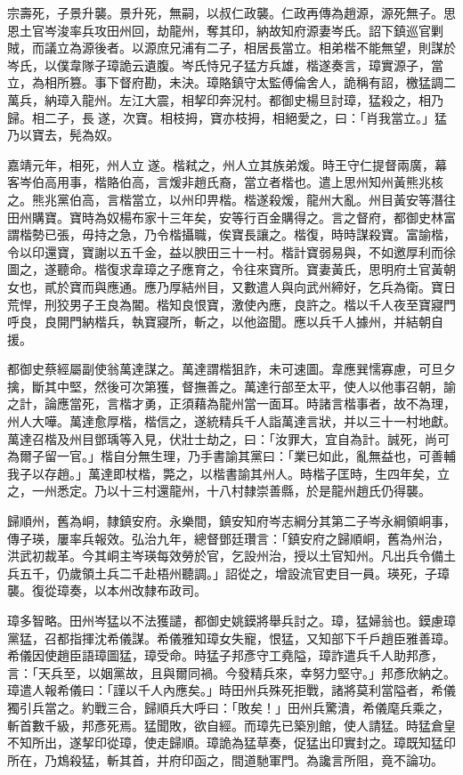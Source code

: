 \begin{pinyinscope}
宗壽死，子景升襲。景升死，無嗣，以叔仁政襲。仁政再傳為趙源，源死無子。思恩土官岑浚率兵攻田州回，劫龍州，奪其印，納故知府源妻岑氏。詔下鎮巡官剿賊，而議立為源後者。以源庶兄浦有二子，相居長當立。相弟楷不能無望，則謀於岑氏，以僕韋隊子璋詭云遺腹。岑氏恃兄子猛方兵雄，楷遂奏言，璋實源子，當立，為相所篡。事下督府勘，未決。璋賂鎮守太監傅倫舍人，詭稱有詔，檄猛調二萬兵，納璋入龍州。左江大震，相挈印奔況村。都御史楊旦討璋，猛殺之，相乃歸。相二子，長遂，次寶。相枝拇，寶亦枝拇，相絕愛之，曰：「肖我當立。」猛乃以寶去，髡為奴。

嘉靖元年，相死，州人立遂。楷弒之，州人立其族弟煖。時王守仁提督兩廣，幕客岑伯高用事，楷賂伯高，言煖非趙氏裔，當立者楷也。遣上思州知州黃熊兆核之。熊兆黨伯高，言楷當立，以州印畀楷。楷遂殺煖，龍州大亂。州目黃安等潛往田州購寶。寶時為奴楊布家十三年矣，安等行百金購得之。言之督府，都御史林富謂楷勢已張，毋持之急，乃令楷攝職，俟寶長讓之。楷復，時時謀殺寶。富諭楷，令以印還寶，寶謝以五千金，益以腴田三十一村。楷計寶弱易與，不如邀厚利而徐圖之，遂聽命。楷復求韋璋之子應育之，令往來寶所。寶妻黃氏，思明府土官黃朝女也，貳於寶而與應通。應乃厚結州目，又數遣人與向武州締好，乞兵為衛。寶日荒悍，刑狡男子王良為閽。楷知良恨寶，激使內應，良許之。楷以千人夜至寶寢門呼良，良開門納楷兵，執寶寢所，斬之，以他盜聞。應以兵千人據州，并結朝自援。

都御史蔡經屬副使翁萬達謀之。萬達謂楷狙詐，未可速圖。韋應巽懦寡慮，可旦夕擒，斷其中堅，然後可次第獲，督撫善之。萬達行部至太平，使人以他事召朝，諭之計，論應當死，言楷才勇，正須藉為龍州當一面耳。時諸言楷事者，故不為理，州人大嘩。萬達愈厚楷，楷信之，遂統精兵千人詣萬達言狀，并以三十一村地獻。萬達召楷及州目鄧瑀等入見，伏壯士劫之，曰：「汝罪大，宜自為計。誠死，尚可為爾子留一官。」楷自分無生理，乃手書諭其黨曰：「業已如此，亂無益也，可善輔我子以存趙。」萬達即杖楷，斃之，以楷書諭其州人。時楷子匡時，生四年矣，立之，一州悉定。乃以十三村還龍州，十八村隸崇善縣，於是龍州趙氏仍得襲。

歸順州，舊為峒，隸鎮安府。永樂間，鎮安知府岑志綱分其第二子岑永綱領峒事，傳子瑛，屢率兵報效。弘治九年，總督鄧廷瓚言：「鎮安府之歸順峒，舊為州治，洪武初裁革。今其峒主岑瑛每效勞於官，乞設州治，授以土官知州。凡出兵令備土兵五千，仍歲領土兵二千赴梧州聽調。」詔從之，增設流官吏目一員。瑛死，子璋襲。復從璋奏，以本州改隸布政司。

璋多智略。田州岑猛以不法獲譴，都御史姚鏌將舉兵討之。璋，猛婦翁也。鏌慮璋黨猛，召都指揮沈希儀謀。希儀雅知璋女失寵，恨猛，又知部下千戶趙臣雅善璋。希儀因使趙臣語璋圖猛，璋受命。時猛子邦彥守工堯隘，璋詐遣兵千人助邦彥，言：「天兵至，以姻黨故，且與爾同禍。今發精兵來，幸努力堅守。」邦彥欣納之。璋遣人報希儀曰：「謹以千人內應矣。」時田州兵殊死拒戰，諸將莫利當隘者，希儀獨引兵當之。約戰三合，歸順兵大呼曰：「敗矣！」田州兵驚潰，希儀麾兵乘之，斬首數千級，邦彥死焉。猛聞敗，欲自經。而璋先已築別館，使人請猛。時猛倉皇不知所出，遂挈印從璋，使走歸順。璋詭為猛草奏，促猛出印實封之。璋既知猛印所在，乃鴆殺猛，斬其首，并府印函之，間道馳軍門。為讒言所阻，竟不論功。


\end{pinyinscope}
